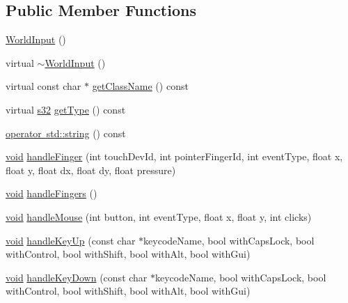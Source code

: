 \subsection*{Public Member Functions}
\begin{DoxyCompactItemize}
\item 
\mbox{\hyperlink{classnjli_1_1_world_input_a89828d16ae9ac53f0eefb12449aafe52}{World\+Input}} ()
\item 
virtual \mbox{\hyperlink{classnjli_1_1_world_input_a742332c1db757e346d72bc5f71b9f1e0}{$\sim$\+World\+Input}} ()
\item 
virtual const char $\ast$ \mbox{\hyperlink{classnjli_1_1_world_input_a52568419faf8a25092f2261640598d63}{get\+Class\+Name}} () const
\item 
virtual \mbox{\hyperlink{_util_8h_aa62c75d314a0d1f37f79c4b73b2292e2}{s32}} \mbox{\hyperlink{classnjli_1_1_world_input_ab2554a67aa2c53446395db34315a4d2a}{get\+Type}} () const
\item 
\mbox{\hyperlink{classnjli_1_1_world_input_a69448c86610047b676f79439d7e57662}{operator std\+::string}} () const
\item 
\mbox{\hyperlink{_thread_8h_af1e856da2e658414cb2456cb6f7ebc66}{void}} \mbox{\hyperlink{classnjli_1_1_world_input_a83e48cc5f90259fad76fe07d3a0fa908}{handle\+Finger}} (int touch\+Dev\+Id, int pointer\+Finger\+Id, int event\+Type, float x, float y, float dx, float dy, float pressure)
\item 
\mbox{\hyperlink{_thread_8h_af1e856da2e658414cb2456cb6f7ebc66}{void}} \mbox{\hyperlink{classnjli_1_1_world_input_a18d58988cf07800960c5952e1f18d64c}{handle\+Fingers}} ()
\item 
\mbox{\hyperlink{_thread_8h_af1e856da2e658414cb2456cb6f7ebc66}{void}} \mbox{\hyperlink{classnjli_1_1_world_input_a6c7011e9f8635a33b34afe24a8bc5b08}{handle\+Mouse}} (int button, int event\+Type, float x, float y, int clicks)
\item 
\mbox{\hyperlink{_thread_8h_af1e856da2e658414cb2456cb6f7ebc66}{void}} \mbox{\hyperlink{classnjli_1_1_world_input_aa63d0257cecc72faedd01402d9f1df9c}{handle\+Key\+Up}} (const char $\ast$keycode\+Name, bool with\+Caps\+Lock, bool with\+Control, bool with\+Shift, bool with\+Alt, bool with\+Gui)
\item 
\mbox{\hyperlink{_thread_8h_af1e856da2e658414cb2456cb6f7ebc66}{void}} \mbox{\hyperlink{classnjli_1_1_world_input_acf44c953918ba64ec4aa0973fcc16ce2}{handle\+Key\+Down}} (const char $\ast$keycode\+Name, bool with\+Caps\+Lock, bool with\+Control, bool with\+Shift, bool with\+Alt, bool with\+Gui)

\end{DoxyCompactItemize}
